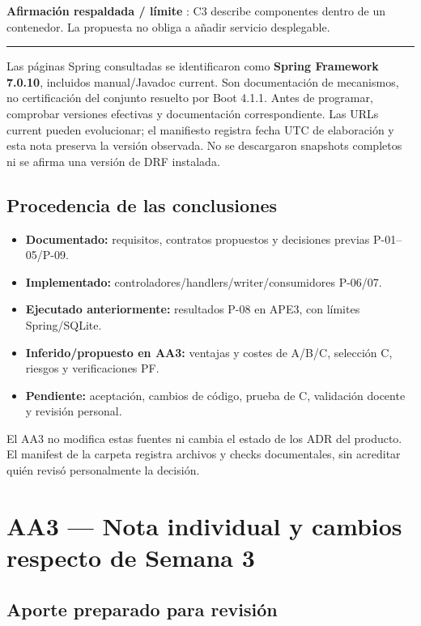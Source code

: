 \documentclass[12pt,a4paper]{report}
\providecommand{\tightlist}{\setlength{\itemsep}{0pt}\setlength{\parskip}{0pt}}
\begin{document}
\textbf{Afirmación respaldada / límite }: C3 describe componentes dentro
de un contenedor. La propuesta no obliga a añadir servicio desplegable.

\medskip\hrule\medskip

Las páginas Spring consultadas se identificaron como \textbf{Spring
Framework 7.0.10}, incluidos manual/Javadoc current. Son documentación
de mecanismos, no certificación del conjunto resuelto por Boot 4.1.1.
Antes de programar, comprobar versiones efectivas y documentación
correspondiente. Las URLs current pueden evolucionar; el manifiesto
registra fecha UTC de elaboración y esta nota preserva la versión
observada. No se descargaron snapshots completos ni se afirma una
versión de DRF instalada.

\section{Procedencia de las
conclusiones}\label{fuentes-procedencia-de-las-conclusiones}

\begin{itemize}
\tightlist
\item
  \textbf{Documentado:} requisitos, contratos propuestos y decisiones
  previas P-01--05/P-09.
\item
  \textbf{Implementado:} controladores/handlers/writer/consumidores
  P-06/07.
\item
  \textbf{Ejecutado anteriormente:} resultados P-08 en APE3, con límites
  Spring/SQLite.
\item
  \textbf{Inferido/propuesto en AA3:} ventajas y costes de A/B/C,
  selección C, riesgos y verificaciones PF.
\item
  \textbf{Pendiente:} aceptación, cambios de código, prueba de C,
  validación docente y revisión personal.
\end{itemize}

El AA3 no modifica estas fuentes ni cambia el estado de los ADR del
producto. El manifest de la carpeta registra archivos y checks
documentales, sin acreditar quién revisó personalmente la decisión.
\chapter{AA3 --- Nota individual y cambios respecto de Semana
3}\label{nota-aa3--nota-individual-y-cambios-respecto-de-semana-3}



\section{Aporte preparado para
revisión}\label{nota-aporte-preparado-para-revisiuxf3n}
\end{document}
